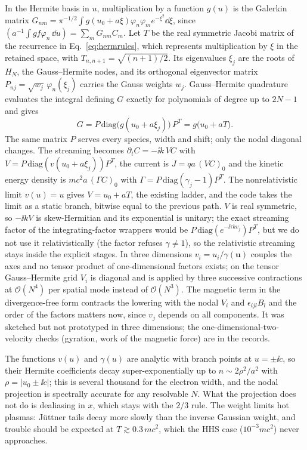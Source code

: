 In the Hermite basis in $u$, multiplication by a function $g(u)$ is the Galerkin matrix $G_{nm}=\pi^{-1/2}\int g(u_0+a\xi)\varphi_n\varphi_m e^{-\xi^2}\dd\xi$, since $(a^{-1}\!\int g f\varphi_n\,\dd u)=\sum_mG_{nm}C_m$. Let $T$ be the real symmetric Jacobi matrix of the recurrence in Eq.~\eqref{eq:hermrules}, which represents multiplication by $\xi$ in the retained space, with $T_{n,n+1}=\sqrt{(n+1)/2}$. Its eigenvalues $\xi_j$ are the roots of $H_N$, the Gauss--Hermite nodes, and its orthogonal eigenvector matrix $P_{nj}=\sqrt{w_j}\,\varphi_n(\xi_j)$ carries the Gauss weights $w_j$. Gauss--Hermite quadrature evaluates the integral defining $G$ exactly for polynomials of degree up to $2N-1$ and gives
\begin{equation}
G=P\,\mathrm{diag}\big(g(u_0+a\xi_j)\big)\,P^{T}=g\big(u_0+aT\big).
\label{eq:nodal}
\end{equation}
The same matrix $P$ serves every species, width and shift; only the nodal diagonal changes. The streaming becomes $\partial_tC=-\ii k\,V C$ with $V=P\,\mathrm{diag}(v(u_0+a\xi_j))P^T$, the current is $J=qa\,(VC)_0$ and the kinetic energy density is $mc^2a\,(\Gamma C)_0$ with $\Gamma=P\,\mathrm{diag}(\gamma_j-1)P^T$. The nonrelativistic limit $v(u)=u$ gives $V=u_0+aT$, the existing ladder, and the code takes the limit as a static branch, bitwise equal to the previous path. $V$ is real symmetric, so $-\ii kV$ is skew-Hermitian and its exponential is unitary; the exact streaming factor of the integrating-factor wrappers would be $P\,\mathrm{diag}(e^{-\ii\tau kv_j})P^T$, but we do not use it relativistically (the factor refuses $\gamma\ne1$), so the relativistic streaming stays inside the explicit stages. In three dimensions $v_i=u_i/\gamma(\mathbf u)$ couples the axes and no tensor product of one-dimensional factors exists; on the tensor Gauss--Hermite grid $V_i$ is diagonal and is applied by three successive contractions at $\mathcal O(N^4)$ per spatial mode instead of $\mathcal O(N^3)$. The magnetic term in the divergence-free form contracts the lowering with the nodal $V_i$ and $\epsilon_{ijl}B_l$ and the order of the factors matters now, since $v_j$ depends on all components. It was sketched but not prototyped in three dimensions; the one-dimensional-two-velocity checks (gyration, work of the magnetic force) are in the records.

The functions $v(u)$ and $\gamma(u)$ are analytic with branch points at $u=\pm\ii c$, so their Hermite coefficients decay super-exponentially up to $n\sim2\rho^2/a^2$ with $\rho=|u_0\pm\ii c|$; this is several thousand for the electron width, and the nodal projection is spectrally accurate for any resolvable $N$. What the projection does not do is dealiasing in $x$, which stays with the $2/3$ rule. The weight limits hot plasmas: J\"uttner tails decay more slowly than the inverse Gaussian weight, and trouble should be expected at $T\gtrsim0.3\,mc^2$, which the HHS case ($10^{-3}mc^2$) never approaches.

